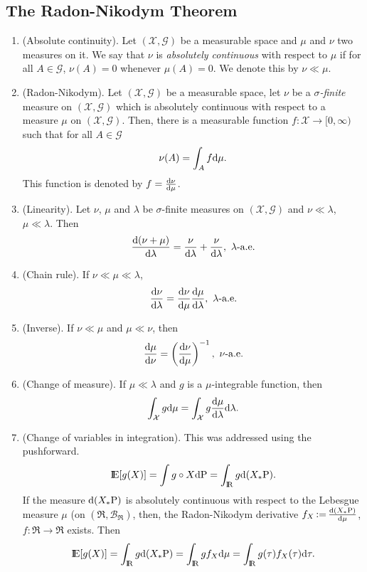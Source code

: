 \documentclass[a4paper,10pt]{article}
\begin{document}
\subsection{The Radon-Nikodym Theorem}
\begin{enumerate}
 \item (Absolute continuity).
       Let $(\mathcal{X}, \mathscr{G})$ be a measurable space and $\mu$ and $\nu$ two measures on it.
       We say that $\nu$ is \textit{absolutely continuous} with respect to $\mu$ if
       for all $A\in\mathscr{G}$, $\nu(A)=0$ whenever $\mu(A)=0$. We denote this by $\nu\ll\mu$.
 \item (Radon-Nikodym). Let $(\mathcal{X}, \mathscr{G})$ be a measurable space, let $\nu$ be a \textit{$\sigma$-finite}
       measure on $(\mathcal{X}, \mathscr{G})$ which is {absolutely continuous} with respect 
       to a measure $\mu$ on $(\mathcal{X}, \mathscr{G})$. Then, there is a measurable function $f:\mathcal{X}\to[0,\infty)$
       such that for all $A\in \mathcal{G}$
       \[
        \nu(A) = \int_A f \mathrm{d} \mu.
       \]
      This function is denoted by $f=\frac{\mathrm{d}\nu}{\mathrm{d} \mu}$.
 \item (Linearity). Let $\nu$, $\mu$ and $\lambda$ be $\sigma$-finite measures on $(\mathcal{X}, \mathscr{G})$ and $\nu\ll\lambda$, $\mu\ll\lambda$.
       Then
       \[
        \frac{\d(\nu+\mu)}{\d \lambda} = \frac{\nu}{\d \lambda} + \frac{\nu}{\d \lambda},\ \lambda\text{-a.e.}
       \]
 \item (Chain rule). If $\nu\ll\mu\ll\lambda$,
 \[
  \frac{\d\nu}{\d\lambda} = \frac{\d\nu}{\d\mu} \frac{\d\mu}{\d\lambda},\ \lambda\text{-a.e.} 
 \]
 \item (Inverse). If $\nu\ll\mu$ and $\mu\ll\nu$, then
 \[
  \frac{\mathrm{d} \mu}{\mathrm{d} \nu} = \left( \frac{\mathrm{d} \nu}{\mathrm{d} \mu}\right)^{-1},\ \nu\text{-a.e.}
 \]
 \item (Change of measure).
 If $\mu\ll\lambda$ and $g$ is a $\mu$-integrable function, then
 \[
  \int_{\mathcal{X}} g \mathrm{d} \mu = \int_{\mathcal{X}} g \frac{\mathrm{d} \mu}{\mathrm{d} \lambda}\mathrm{d} \lambda.
 \]
 \item (Change of variables in integration). This was addressed using the pushforward. 
 \[
  \E[g(X)] = \int g\circ X\d\prob = \int_\Re g \d(X_*\prob).
 \]
 If the measure $\mathrm{d}(X_*\mathrm{P})$ is absolutely continuous with respect to the Lebesgue 
 measure $\mu$ (on $(\Re, \mathcal{B}_\Re)$, then, the Radon-Nikodym derivative $f_X{}\mathop{\mathrel{:}=}{} \frac{\mathrm{d}(X_*\mathrm{P})}{\mathrm{d} \mu}$,
 $f:\Re\to\Re$ exists. Then
 \[
  \E[g(X)] = \int_\Re g \d(X_*\prob) = \int_\Re g f_X \d\mu = \int_\Re g(\tau)f_X(\tau)\d \tau.
 \]

\end{enumerate}
\end{document}
